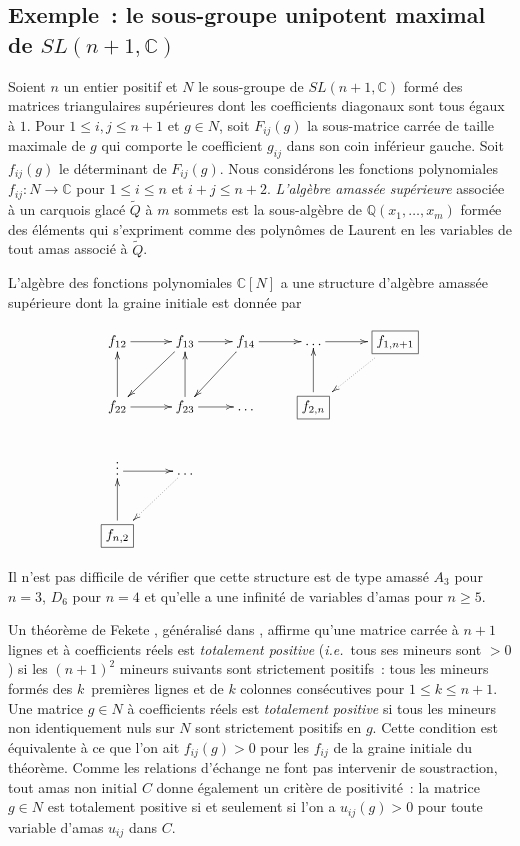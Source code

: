 \documentclass[brochure,12pt]{bourbaki}
\newcommand{\ie}{{\em i.e.}\ }
\numberwithin{equation}{subsection}
\numberwithin{theorem}{section}
\newcommand{\Q}{\mathbb{Q}}
\newcommand{\C}{\mathbb{C}}
\renewcommand{\tilde}[1]{\widetilde{#1}}
\begin{document}
\subsection{Exemple~: le sous-groupe unipotent maximal de $SL(n+1,\C)$}
\label{ss:max-unipotent-sln}

Soient $n$ un entier positif et $N$ le sous-groupe de $SL(n+1,\C)$
form\'e des matrices triangulaires sup\'erieures dont les coefficients
diagonaux sont tous \'egaux \`a $1$. Pour $1\leq i,j\leq n+1$ et
$g\in N$, soit $F_{ij}(g)$ la sous-matrice carr\'ee de taille
maximale de $g$ qui comporte le coefficient $g_{ij}$ dans son coin inf\'erieur gauche.
Soit $f_{ij}(g)$ le d\'eterminant de $F_{ij}(g)$. Nous
consid\'erons les fonctions polynomiales $f_{ij}: N \to \C$
pour $1\leq i\leq n$ et $i+j\leq n+2$.
{\em L'alg\`ebre amass\'ee sup\'erieure} associ\'ee \`a un
carquois glac\'e $\tilde{Q}$ \`a $m$ sommets est la sous-alg\`ebre de
$\Q(x_1, \ldots, x_m)$ form\'ee des \'el\'ements qui s'expriment
comme des polyn\^omes de Laurent en les variables de tout
amas associ\'e \`a $\tilde{Q}$.


\begin{theo}
\label{thm:alg-amassee-matrices-unipotentes}
L'alg\`ebre des
fonctions polynomiales $\C[N]$ a une structure d'alg\`ebre amass\'ee
sup\'erieure dont la graine initiale est donn\'ee par
\end{theo}
\[
\xymatrix{
f_{12} \ar[r] & f_{13} \ar[r] \ar[dl] & f_{14} \ar[dl] \ar[r] & \ldots \ar[r] & \framebox{$f_{1,n+1}$} \ar@{.>}[dl] \\
f_{22} \ar[u] \ar[r]
             & f_{23} \ar[u] \ar[r]  & \ldots         & \framebox{$f_{2,n}$} \ar[u]     &   \\
\vdots \ar[r]       &  \ldots \ar@{.>}[dl]                     &          &               &   \\
\framebox{$f_{n,2}$} \ar[u] &                    &                &               &
}
\]

Il n'est pas difficile de v\'erifier que cette structure est
de type amass\'e $A_3$ pour $n=3$, $D_6$ pour $n=4$ et qu'elle a une
infinit\'e de variables d'amas pour $n\geq 5$.

Un th\'eor\`eme de Fekete \cite{Fekete1912}, g\'en\'eralis\'e dans
\cite{BerensteinFominZelevinsky96}, affirme qu'une matrice carr\'ee \`a
$n+1$ lignes et \`a coefficients r\'eels est {\em totalement positive}
(\ie tous ses mineurs sont $>0$) si les $(n+1)^2$ mineurs suivants
sont strictement positifs~: tous les mineurs form\'es des 
$k$~premi\`eres lignes et de $k$ colonnes cons\'ecutives pour $1\leq
k\leq n+1$. Une matrice $g\in N$ \`a coefficients r\'eels est
{\em totalement positive} si tous les mineurs non identiquement nuls
sur $N$ sont strictement positifs en $g$. Cette condition
est \'equivalente \`a ce que l'on ait $f_{ij}(g)>0$ pour les
$f_{ij}$ de la graine initiale du th\'eor\`eme. Comme les
relations d'\'echange ne font pas intervenir de soustraction,
tout amas non initial $C$ donne \'egalement un crit\`ere de
positivit\'e~: la matrice $g\in N$ est totalement positive si et seulement si
l'on a $u_{ij}(g)>0$ pour toute variable d'amas $u_{ij}$ dans $C$.
\end{document}
